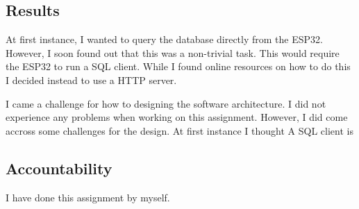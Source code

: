 
\subsection{Results}

At first instance, I wanted to query the database directly from the ESP32.
However, I soon found out that this was a non-trivial task.
This would require the ESP32 to run a SQL client.
While I found online resources on how to do this
I decided instead to use a HTTP server.


I came a challenge for how to designing the software architecture.
I did not experience any problems when working on this assignment.
However, I did come accross some challenges for the design.
At first instance I thought 
A SQL client is 

\subsection{Accountability}

I have done this assignment by myself.

\clearpage

